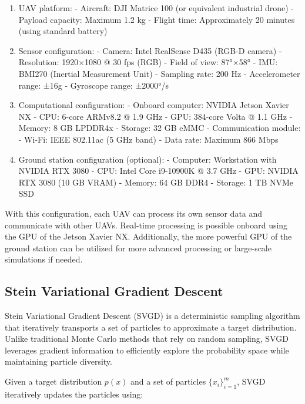 \documentclass[a4paper,fleqn,10pt,twocolumn]{SICE_ISCS}
\begin{document}
\begin{enumerate}
\item UAV platform:
   - Aircraft: DJI Matrice 100 (or equivalent industrial drone)
   - Payload capacity: Maximum 1.2 kg
   - Flight time: Approximately 20 minutes (using standard battery)

\item Sensor configuration:
   - Camera: Intel RealSense D435 (RGB-D camera)
     - Resolution: 1920×1080 @ 30 fps (RGB)
     - Field of view: 87°×58°
   - IMU: BMI270 (Inertial Measurement Unit)
     - Sampling rate: 200 Hz
     - Accelerometer range: ±16g
     - Gyroscope range: ±2000°/s

\item Computational configuration:
   - Onboard computer: NVIDIA Jetson Xavier NX
     - CPU: 6-core ARMv8.2 @ 1.9 GHz
     - GPU: 384-core Volta @ 1.1 GHz
     - Memory: 8 GB LPDDR4x
     - Storage: 32 GB eMMC
   - Communication module:
     - Wi-Fi: IEEE 802.11ac (5 GHz band)
     - Data rate: Maximum 866 Mbps

\item Ground station configuration (optional):
   - Computer: Workstation with NVIDIA RTX 3080
     - CPU: Intel Core i9-10900K @ 3.7 GHz
     - GPU: NVIDIA RTX 3080 (10 GB VRAM)
     - Memory: 64 GB DDR4
     - Storage: 1 TB NVMe SSD
\end{enumerate}

With this configuration, each UAV can process its own sensor data and communicate with other UAVs. Real-time processing is possible onboard using the GPU of the Jetson Xavier NX. Additionally, the more powerful GPU of the ground station can be utilized for more advanced processing or large-scale simulations if needed.

\subsection{Stein Variational Gradient Descent}

Stein Variational Gradient Descent (SVGD) is a deterministic sampling algorithm that iteratively transports a set of particles to approximate a target distribution. Unlike traditional Monte Carlo methods that rely on random sampling, SVGD leverages gradient information to efficiently explore the probability space while maintaining particle diversity.

Given a target distribution $p(x)$ and a set of particles $\{x_i\}_{i=1}^m$, SVGD iteratively updates the particles using:
\end{document}
